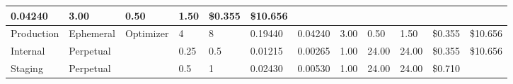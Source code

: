 \begin{landscape}
\begin{table}[!htbp]
\begin{tabular}{llllllllllll}
      \multicolumn{1}{l|}{\cellcolor[HTML]{69BF7B}0.04240} &
      \multicolumn{1}{l|}{\cellcolor[HTML]{FFE082}3.00} &
      \multicolumn{1}{l|}{\cellcolor[HTML]{B0D47F}0.50} &
      \multicolumn{1}{l|}{\cellcolor[HTML]{6BC07B}1.50} &
      \multicolumn{1}{l|}{\cellcolor[HTML]{FFEB84}\$0.355} &
      \multicolumn{1}{l|}{\cellcolor[HTML]{FFEB84}\$10.656} \\ \hline
    \multicolumn{1}{|l|}{\cellcolor[HTML]{EFC321}Production} &
      \multicolumn{1}{l|}{\cellcolor[HTML]{99CCFF}Ephemeral} &
      \multicolumn{1}{l|}{\cellcolor[HTML]{B8DD2F}Optimizer} &
      \multicolumn{1}{l|}{\cellcolor[HTML]{63BE7B}4} &
      \multicolumn{1}{l|}{\cellcolor[HTML]{63BE7B}8} &
      \multicolumn{1}{l|}{\cellcolor[HTML]{F8696B}0.19440} &
      \multicolumn{1}{l|}{\cellcolor[HTML]{69BF7B}0.04240} &
      \multicolumn{1}{l|}{\cellcolor[HTML]{FFE082}3.00} &
      \multicolumn{1}{l|}{\cellcolor[HTML]{B0D47F}0.50} &
      \multicolumn{1}{l|}{\cellcolor[HTML]{6BC07B}1.50} &
      \multicolumn{1}{l|}{\cellcolor[HTML]{FFEB84}\$0.355} &
      \multicolumn{1}{l|}{\cellcolor[HTML]{FFEB84}\$10.656} \\ \hline
    \multicolumn{1}{|l|}{\cellcolor[HTML]{92D050}Internal} &
      \multicolumn{1}{l|}{\cellcolor[HTML]{C6E0B4}Perpetual} &
      \multicolumn{1}{l|}{\cellcolor[HTML]{7030A0}{\color[HTML]{FFFFFF} BackendAPI}} &
      \multicolumn{1}{l|}{\cellcolor[HTML]{F8696B}0.25} &
      \multicolumn{1}{l|}{\cellcolor[HTML]{F8696B}0.5} &
      \multicolumn{1}{l|}{\cellcolor[HTML]{63BE7B}0.01215} &
      \multicolumn{1}{l|}{\cellcolor[HTML]{63BE7B}0.00265} &
      \multicolumn{1}{l|}{\cellcolor[HTML]{FFEB84}1.00} &
      \multicolumn{1}{l|}{\cellcolor[HTML]{F8696B}24.00} &
      \multicolumn{1}{l|}{\cellcolor[HTML]{F8696B}24.00} &
      \multicolumn{1}{l|}{\cellcolor[HTML]{FFEB84}\$0.355} &
      \multicolumn{1}{l|}{\cellcolor[HTML]{FFEB84}\$10.656} \\ \hline
    \multicolumn{1}{|l|}{\cellcolor[HTML]{FFFF00}Staging} &
      \multicolumn{1}{l|}{\cellcolor[HTML]{C6E0B4}Perpetual} &
      \multicolumn{1}{l|}{\cellcolor[HTML]{7030A0}{\color[HTML]{FFFFFF} BackendAPI}} &
      \multicolumn{1}{l|}{\cellcolor[HTML]{FFEB84}0.5} &
      \multicolumn{1}{l|}{\cellcolor[HTML]{FFEB84}1} &
      \multicolumn{1}{l|}{\cellcolor[HTML]{FFEB84}0.02430} &
      \multicolumn{1}{l|}{\cellcolor[HTML]{63BE7B}0.00530} &
      \multicolumn{1}{l|}{\cellcolor[HTML]{FFEB84}1.00} &
      \multicolumn{1}{l|}{\cellcolor[HTML]{F8696B}24.00} &
      \multicolumn{1}{l|}{\cellcolor[HTML]{F8696B}24.00} &
      \multicolumn{1}{l|}{\cellcolor[HTML]{F8696B}\$0.710} &

\end{tabular}
\end{table}
\end{landscape}
